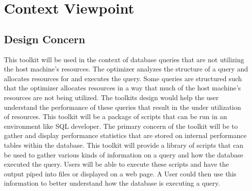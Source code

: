 \documentclass[draftclsnofoot, onecolumn, compsoc, 10pt]{IEEEtran}
\begin{document}
\bgroup
\def\arraystretch{1.5}
\egroup


\section{Context Viewpoint}
\subsection{Design Concern}
This toolkit will be used in the context of database queries that are not utilizing the host machine's resources.
The optimizer analyzes the structure of a query and allocates resources for and executes the query.
Some queries are structured such that the optimizer allocates resources in a way that much of the host machine's resources are not being utilized.
The toolkits design would help the user understand the performance of these queries that result in the under utilization of resources.
This toolkit will be a package of scripts that can be run in an environment like SQL developer.
The primary concern of the toolkit will be to gather and display performance statistics that are stored on internal performance tables within the database.
This toolkit will provide a library of scripts that can be used to gather various kinds of information on a query and how the database executed the query.
Users will be able to execute these scripts and have the output piped into files or displayed on a web page.
A User could then use this information to better understand how the database is executing a query.
\end{document}
